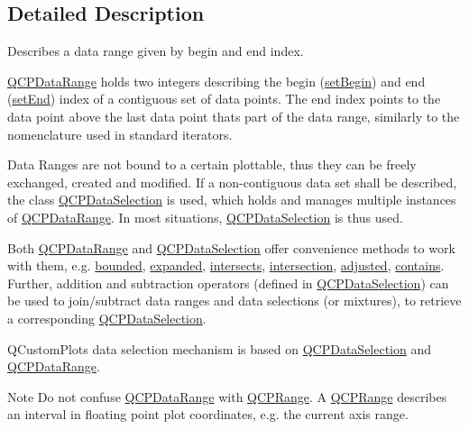 \subsection{Detailed Description}
Describes a data range given by begin and end index. 

\hyperlink{classQCPDataRange}{Q\+C\+P\+Data\+Range} holds two integers describing the begin (\hyperlink{classQCPDataRange_a54ff59048e01e46ac4aefafc844626c6}{set\+Begin}) and end (\hyperlink{classQCPDataRange_a277f1a9eafe70b9184d9c00b641ae5de}{set\+End}) index of a contiguous set of data points. The end index points to the data point above the last data point that\textquotesingle{}s part of the data range, similarly to the nomenclature used in standard iterators.

Data Ranges are not bound to a certain plottable, thus they can be freely exchanged, created and modified. If a non-\/contiguous data set shall be described, the class \hyperlink{classQCPDataSelection}{Q\+C\+P\+Data\+Selection} is used, which holds and manages multiple instances of \hyperlink{classQCPDataRange}{Q\+C\+P\+Data\+Range}. In most situations, \hyperlink{classQCPDataSelection}{Q\+C\+P\+Data\+Selection} is thus used.

Both \hyperlink{classQCPDataRange}{Q\+C\+P\+Data\+Range} and \hyperlink{classQCPDataSelection}{Q\+C\+P\+Data\+Selection} offer convenience methods to work with them, e.\+g. \hyperlink{classQCPDataRange_a4de1bec5a6e1145bd332d93ac2cc8327}{bounded}, \hyperlink{classQCPDataRange_a92eb8e85db62f0f833486fa4521fb586}{expanded}, \hyperlink{classQCPDataRange_afda3603f6ca7cb5c518cdaeea45af267}{intersects}, \hyperlink{classQCPDataRange_a2c56cbc35c3beaed34fca1839d570520}{intersection}, \hyperlink{classQCPDataRange_a7a7a144cd3df55a6e011b9a84f0f8b69}{adjusted}, \hyperlink{classQCPDataRange_a691620b718e4bcefb77bcdde88bd1b34}{contains}. Further, addition and subtraction operators (defined in \hyperlink{classQCPDataSelection}{Q\+C\+P\+Data\+Selection}) can be used to join/subtract data ranges and data selections (or mixtures), to retrieve a corresponding \hyperlink{classQCPDataSelection}{Q\+C\+P\+Data\+Selection}.

Q\+Custom\+Plot\textquotesingle{}s data selection mechanism is based on \hyperlink{classQCPDataSelection}{Q\+C\+P\+Data\+Selection} and \hyperlink{classQCPDataRange}{Q\+C\+P\+Data\+Range}.

\begin{DoxyNote}{Note}
Do not confuse \hyperlink{classQCPDataRange}{Q\+C\+P\+Data\+Range} with \hyperlink{classQCPRange}{Q\+C\+P\+Range}. A \hyperlink{classQCPRange}{Q\+C\+P\+Range} describes an interval in floating point plot coordinates, e.\+g. the current axis range. 
\end{DoxyNote}


